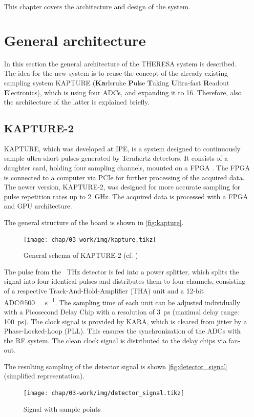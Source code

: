 This chapter covers the architecture and design of the system.
\section{General architecture}
In this section the general architecture of the THERESA system is described.
The idea for the new system is to reuse the concept of the already existing sampling system KAPTURE (\textbf{Ka}rlsruhe \textbf{P}ulse \textbf{T}aking \textbf{U}ltra-fast \textbf{R}eadout \textbf{E}lectronics), which is using four ADCs, and expanding it to 16. Therefore, also the architecture of the latter is explained briefly.
\subsection{KAPTURE-2}
KAPTURE, which was developed at IPE, is a system designed to continuously sample ultra-short pulses generated by Terahertz detectors. It consists of a daughter card, holding four sampling channels, mounted on a FPGA . The FPGA is connected to a computer via PCIe for further processing of the acquired data. \cite{brosi} 
The newer version, KAPTURE-2, was designed for more accurate sampling for pulse repetition rates up to \SI{2}{\giga \hertz}. The acquired data is processed with a FPGA and GPU architecture.  \cite{caselleKAP}

The general structure of the board is shown in \autoref{fig:kapture}.

\begin{figure}[H]
	\centering
	\texttt{[image: chap/03-work/img/kapture.tikz]}
	\caption{General schema of KAPTURE-2 (cf. \cite[p.2]{caselleKAP})}
	\label{fig:kapture}
\end{figure}


The pulse from the \SI{}{\tera \hertz} detector is fed into a power splitter, which splits the signal into four identical pulses and distributes them to four channels, consisting of a respective Track-And-Hold-Amplifier (THA) unit and a 12-bit ADC@\SI{500}{\mega\sample\per\second}. The sampling time of each unit can be adjusted individually with a Picosecond Delay Chip with a resolution of \SI{3}{\pico \second} (maximal delay range: \SI{100}{\pico \second}). 
The clock signal is provided by KARA, which is cleared from jitter by a Phase-Locked-Loop (PLL). This ensures the synchronization of the ADCs with the RF system. The clean clock signal is distributed to the delay chips via fan-out. \cite{caselleKAP}

The resulting sampling of the detector signal is shown \autoref{fig:detector_signal} (simplified representation).
\begin{figure}[H]
	\centering
	\texttt{[image: chap/03-work/img/detector\_signal.tikz]}
	\caption{Signal with sample points}
	\label{fig:detector_signal}
\end{figure}

